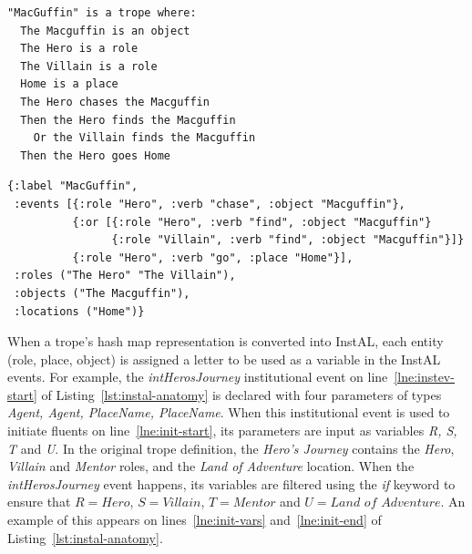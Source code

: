\documentclass[11pt]{report}
\begin{document}
\begin{lstlisting}[showstringspaces=false, label={lst:macguffin-listing},
caption={A simplified example of the ``MacGuffin'' trope}]
"MacGuffin" is a trope where:
  The Macguffin is an object
  The Hero is a role
  The Villain is a role
  Home is a place
  The Hero chases the Macguffin
  Then the Hero finds the Macguffin
    Or the Villain finds the Macguffin
  Then the Hero goes Home
\end{lstlisting}

\begin{lstlisting}[showstringspaces=false, label={lst:macguffin-hashmap},
caption={Hash Map representation of the ``MacGuffin trope from Listing~\ref{lst:macguffin}''}]
{:label "MacGuffin",
 :events [{:role "Hero", :verb "chase", :object "Macguffin"},
          {:or [{:role "Hero", :verb "find", :object "Macguffin"}
                {:role "Villain", :verb "find", :object "Macguffin"}]}
          {:role "Hero", :verb "go", :place "Home"}],
 :roles ("The Hero" "The Villain"),
 :objects ("The Macguffin"),
 :locations ("Home")}
\end{lstlisting}

When a trope's hash map representation is converted into InstAL, each entity
(role, place, object) is assigned a letter to be used as a variable in the
InstAL events. For example, the \emph{intHerosJourney} institutional event on
line~\ref{lne:instev-start} of Listing~\ref{lst:instal-anatomy} is declared with four parameters of types
\emph{Agent, Agent, PlaceName, PlaceName}. When this institutional event is used
to initiate fluents on line~\ref{lne:init-start}, its parameters are input as
variables \emph{R, S, T} and \emph{U}. In the original trope definition, the
\emph{Hero's Journey} contains the \emph{Hero}, \emph{Villain} and \emph{Mentor}
roles, and the \emph{Land of Adventure} location. When the
\emph{intHerosJourney} event happens, its variables are filtered using the
\emph{if} keyword to ensure that $R = \textit{Hero}$, $S = \textit{Villain}$, $T
= \textit{Mentor}$ and $U = \textit{Land of Adventure}$. An example of this
appears on lines~\ref{lne:init-vars} and~\ref{lne:init-end} of Listing~\ref{lst:instal-anatomy}.
\end{document}
